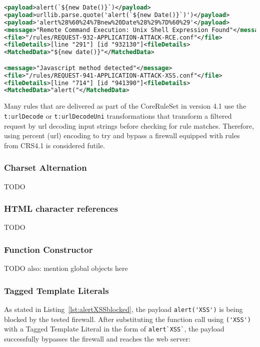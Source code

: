 \begin{lstlisting}[style=ruleStyle, language=XML, caption=url encoded example blocked, label={lst:urlencodedexampleblocked}]
<payload>alert(`${new Date()}`)</payload>
<payload>urllib.parse.quote('alert(`${new Date()}`)')</payload>
<payload>'alert%28%60%24%7Bnew%20Date%28%29%7D%60%29'</payload>
<message>"Remote Command Execution: Unix Shell Expression Found"</message>
<file>"/rules/REQUEST-932-APPLICATION-ATTACK-RCE.conf"</file>
<fileDetails>[line "291"] [id "932130"]<fileDetails>
<MatchedData>"${new date()}"</MatchedData>

<message>"Javascript method detected"</message>
<file>"/rules/REQUEST-941-APPLICATION-ATTACK-XSS.conf"</file>
<fileDetails>[line "714"] [id "941390"]<fileDetails>
<MatchedData>"alert("</MatchedData>
\end{lstlisting}

Many rules that are delivered as part of the CoreRuleSet in version 4.1 use the \verb|t:urlDecode| or \verb|t:urlDecodeUni| transformations that transform a filtered request by url decoding input strings before checking for rule matches. Therefore, using percent (url) encoding to try and bypass a firewall equipped with rules from CRS4.1 is considered futile.


\subsubsection{Charset Alternation}
{\color{red}TODO }

\subsubsection{HTML character references}
\label{sec:htmlcharrefsingleeva}
{\color{red}TODO }

\subsubsection{Function Constructor}
\label{sec:functionconstructorsingleeva}
{\color{red}TODO also: mention global objects here \cite{js/builtin}}

\subsubsection{Tagged Template Literals}
\label{sec:taggedtemplateliteralsevaluation}
As stated in Listing~\ref{lst:alertXSSblocked}, the payload \verb|alert('XSS')| is being blocked by the tested firewall.
After substituting the function call using \verb|('XSS')| with a Tagged Template Literal in the form of \verb|alert`XSS`|, the payload successfully bypasses the firewall and reaches the web server: 

